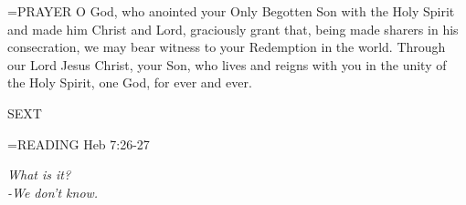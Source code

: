 \hangindent=\parindent \small{PRAYER 	O God, who anointed your Only Begotten Son with the Holy Spirit and made him Christ and Lord, graciously grant that, being made sharers in his consecration, we may bear witness to your Redemption in the world. Through our Lord Jesus Christ, your Son, who lives and reigns with you in the unity of the Holy Spirit, one God, for ever and ever.}

\begin{flushleft}\normalsize SEXT\\\end{flushleft}

\hangindent=\parindent \small{\uppercase{READING}}    Heb 7:26-27 \textbf{   \\}

\begin{center}
\textit{What is it?\\
-We don't know.}
\end{center}
